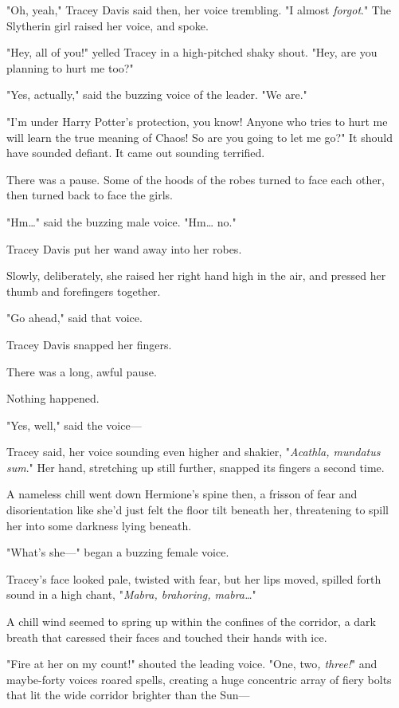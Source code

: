 "Oh, yeah," Tracey Davis said then, her voice trembling. "I almost 
\emph{forgot}." The Slytherin girl raised her voice, and spoke.

"Hey, all of you!" yelled Tracey in a high-pitched shaky shout. "Hey, are you 
planning to hurt me too?"

"Yes, actually," said the buzzing voice of the leader. "We are."

"I'm under Harry Potter's protection, you know! Anyone who tries to hurt me 
will learn the true meaning of Chaos! So are you going to let me go?" It should 
have sounded defiant. It came out sounding terrified.

There was a pause. Some of the hoods of the robes turned to face each other, 
then turned back to face the girls.

"Hm{\ldots}" said the buzzing male voice. "Hm{\ldots} no."

Tracey Davis put her wand away into her robes.

Slowly, deliberately, she raised her right hand high in the air, and pressed 
her thumb and forefingers together.

"Go ahead," said that voice.

Tracey Davis snapped her fingers.

There was a long, awful pause.

Nothing happened.

"Yes, well," said the voice---

Tracey said, her voice sounding even higher and shakier, "\emph{Acathla, 
mundatus sum}." Her hand, stretching up still further, snapped its fingers a 
second time.

A nameless chill went down Hermione's spine then, a frisson of fear and 
disorientation like she'd just felt the floor tilt beneath her, threatening to 
spill her into some darkness lying beneath.

"What's she---" began a buzzing female voice.

Tracey's face looked pale, twisted with fear, but her lips moved, spilled forth 
sound in a high chant, "\emph{Mabra, brahoring, mabra{\ldots}}"

A chill wind seemed to spring up within the confines of the corridor, a dark 
breath that caressed their faces and touched their hands with ice.

"Fire at her on my count!" shouted the leading voice. "One, two\emph{, three!}" 
and maybe-forty voices roared spells, creating a huge concentric array of fiery 
bolts that lit the wide corridor brighter than the Sun---

